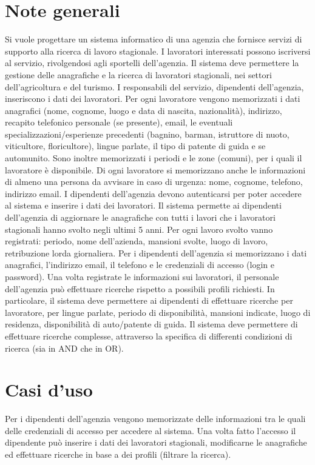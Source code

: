 \documentclass[a4paper, oneside, 12pt]{book}
\begin{document}
\section{Note generali}
Si vuole progettare un sistema informatico di una agenzia che fornisce servizi di supporto alla ricerca
di lavoro stagionale. I lavoratori interessati possono iscriversi al servizio, rivolgendosi agli sportelli
dell’agenzia. Il sistema deve permettere la gestione delle anagrafiche e la ricerca di lavoratori
stagionali, nei settori dell’agricoltura e del turismo.
I responsabili del servizio, dipendenti dell’agenzia, inseriscono i dati dei lavoratori. Per ogni
lavoratore vengono memorizzati i dati anagrafici (nome, cognome, luogo e data di nascita,
nazionalità), indirizzo, recapito telefonico personale (se presente), email, le eventuali
specializzazioni/esperienze precedenti (bagnino, barman, istruttore di nuoto, viticultore,
floricultore), lingue parlate, il tipo di patente di guida e se automunito. Sono inoltre memorizzati i
periodi e le zone (comuni), per i quali il lavoratore è disponibile. Di ogni lavoratore si memorizzano
anche le informazioni di almeno una persona da avvisare in caso di urgenza: nome, cognome,
telefono, indirizzo email.
I dipendenti dell’agenzia devono autenticarsi per poter accedere al sistema e inserire i dati dei
lavoratori. Il sistema permette ai dipendenti dell’agenzia di aggiornare le anagrafiche con tutti i
lavori che i lavoratori stagionali hanno svolto negli ultimi 5 anni. Per ogni lavoro svolto vanno
registrati: periodo, nome dell’azienda, mansioni svolte, luogo di lavoro, retribuzione lorda
giornaliera. Per i dipendenti dell’agenzia si memorizzano i dati anagrafici, l’indirizzo email, il telefono
e le credenziali di accesso (login e password).
Una volta registrate le informazioni sui lavoratori, il personale dell’agenzia può effettuare ricerche
rispetto a possibili profili richiesti.
In particolare, il sistema deve permettere ai dipendenti di effettuare ricerche per lavoratore, per
lingue parlate, periodo di disponibilità, mansioni indicate, luogo di residenza, disponibilità di
auto/patente di guida. Il sistema deve permettere di effettuare ricerche complesse, attraverso la
specifica di differenti condizioni di ricerca (sia in AND che in OR).

\newpage
\section{Casi d'uso}
Per i dipendenti dell’agenzia vengono memorizzate delle informazioni tra le quali delle credenziali di accesso per accedere al sistema. Una volta fatto l’accesso il dipendente può inserire i dati dei lavoratori stagionali, modificarne le anagrafiche ed effettuare ricerche in base a dei profili (filtrare la ricerca). 
\end{document}
